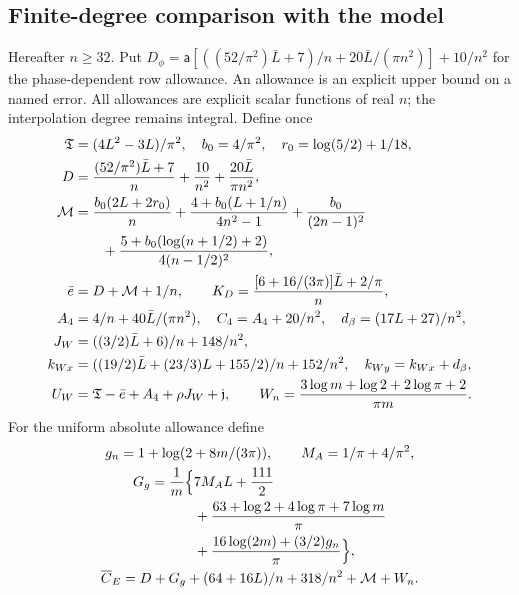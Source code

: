 \subsection{Finite-degree comparison with the model}
\label{uc:finite-comparison}

Hereafter $n\geq32$. Put
$D_\phi=\mathsf a[((52/\pi^2)\bar L+7)/n+20\bar L/(\pi n^2)]+10/n^2$
for the phase-dependent row allowance. An allowance is an explicit upper bound on a named error. All allowances are explicit scalar functions of
real $n$; the interpolation degree remains integral. Define once
\begin{align}\label{uc:constants}
 \mathfrak{T}&=(4L^2-3L)/\pi^2,\quad b_0=4/\pi^2,\quad r_0=\log(5/2)+1/18,\notag\\
 D&=\frac{(52/\pi^2)\bar L+7}{n}+\frac{10}{n^2}+\frac{20\bar L}{\pi n^2},\notag\\
 \mathcal M&=\frac{b_0(2L+2r_0)}n
 +\frac{4+b_0(L+1/n)}{4n^2-1}+\frac{b_0}{(2n-1)^2}\notag\\
 &\qquad+\frac{5+b_0(\log(n+1/2)+2)}{4(n-1/2)^2},\notag\\
 \bar e&=D+\mathcal M+1/n,\qquad
 K_D=\frac{[6+16/(3\pi)]\bar L+2/\pi}{n},\notag\\
 A_4&=4/n+40\bar L/(\pi n^2),\quad C_4=A_4+20/n^2,
 \quad d_\beta=(17L+27)/n^2,\notag\\
 J_W&=((3/2)\bar L+6)/n+148/n^2,\notag\\
 k_{Wx}&=((19/2)\bar L+(23/3)L+155/2)/n+152/n^2,
 \quad k_{Wy}=k_{Wx}+d_\beta,\notag\\
 U_W&=\mathfrak{T}-\bar e+A_4+\rho J_W+\mathfrak j,\qquad
 W_n=\frac{3\log m+\log2+2\log\pi+2}{\pi m}.
\end{align}
For the uniform absolute allowance define
\begin{equation}\label{uc:uniform-allowance}
 \begin{gathered}
 g_n=1+\log(2+8m/(3\pi)),\qquad M_A=1/\pi+4/\pi^2,\\
 \begin{aligned}
 G_g=\frac1m\Bigl\{&7M_A L+\frac{111}2\\
 &+\frac{63+\log2+4\log\pi+7\log m}{\pi}\\
 &+\frac{16\log(2m)+(3/2)g_n}{\pi}\Bigr\},
 \end{aligned}\\
 \overline C_E=D+G_g+(64+16L)/n+318/n^2+\mathcal M+W_n.
 \end{gathered}
\end{equation}

